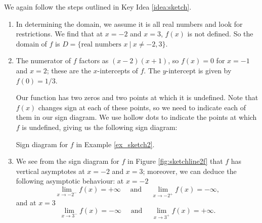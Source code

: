{We again follow the steps outlined in Key Idea \ref{idea:sketch}.

\begin{enumerate}
		\item	In determining the domain, we assume it is all real numbers and look for restrictions. We find that at $x=-2$ and $x=3$, $f(x)$ is not defined. So the domain of $f$ is $D = \{\text{real numbers } x\ | \ x\neq -2,3\}$.
		\item The numerator of $f$ factors as $(x-2)(x+1)$, so $f(x)=0$ for $x=-1$ and $x=2$; these are the $x$-intercepts of $f$. The $y$-intercept is given by $f(0) = 1/3$.
		
Our function has two zeros and two points at which it is undefined. Note that $f(x)$ changes sign at each of these points, so we need to indicate each of them in our sign diagram. We use hollow dots to indicate the points at which $f$ is undefined, giving us the following sign diagram:

\noindent\begin{minipage}{\textwidth}
\begin{center}
\end{center}
\captionsetup{type=figure}%
			\caption{Sign diagram for $f$ in Example \ref{ex_sketch2}.}\label{fig:sketchline2f}
\end{minipage}		

		\item We see from the sign diagram for $f$ in Figure \ref{fig:sketchline2f} that $f$ has vertical asymptotes at $x=-2$ and $x=3$; moreover, we can deduce the following asymptotic behaviour: at $x=-2$
\[
\lim_{x\to -2^-}f(x) = +\infty \quad \text{ and } \quad \lim_{x\to -2^+}f(x) = -\infty,
\]
and at $x=3$
\[
\lim_{x\to 3^-}f(x) = -\infty \quad \text{ and } \quad 
\lim_{x\to 3^+}f(x) = +\infty.
\]


\end{enumerate}}
